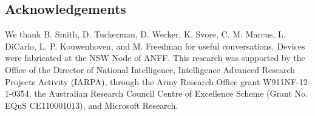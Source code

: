 \subsection{Acknowledgements}
We thank B. Smith, D. Tuckerman, D. Wecker, K. Svore, C. M. Marcus, L. DiCarlo, L. P. Kouwenhoven, and M. Freedman for useful conversations. Devices were fabricated at the NSW Node of ANFF. This research was supported by the Office of the Director of National Intelligence, Intelligence Advanced Research Projects Activity (IARPA), through the Army Research Office grant W911NF-12-1-0354, the Australian Research Council Centre of Excellence Scheme (Grant No. EQuS CE110001013), and Microsoft Research.
